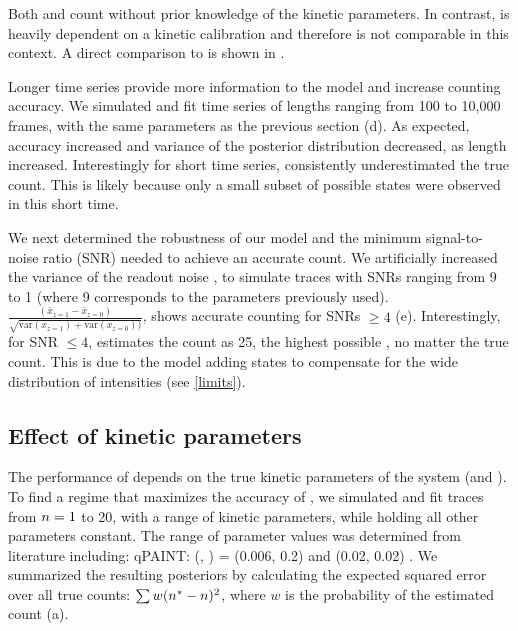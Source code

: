 Both \ours and \lbfcs count without prior knowledge of the kinetic parameters.
	In contrast, \qpaint is heavily dependent on a kinetic calibration and 
	therefore is not comparable in this context.
	A direct comparison to \qpaint is shown in .

Longer time series provide more
information to the model and increase counting accuracy.
	We simulated and fit time series of lengths ranging from 100 to 10,000 frames, with the same parameters 
	as the previous section (d).
	As expected, accuracy increased and variance of the posterior distribution decreased, 
	as length increased.
	Interestingly for short time series, \ours consistently underestimated the true count. 
	This is likely because only a small subset of possible states were observed in this short time. %

We next determined the robustness of our model and the minimum signal-to-noise ratio 
(SNR) needed to achieve an accurate count.
	We artificially increased the variance of the readout noise \camvar, 
	to simulate traces with SNRs ranging from 9 to 1 (where 9 
	corresponds to the parameters previously used).
  $ \frac{(\bar{x}_{z=1} - \bar{x}_{z=0})}{\sqrt{\text{var}(x_{z=1}) + \text{var}(x_{z=0}))}}$, 
	\ours shows accurate counting for SNRs $\geq 4$ (e). 
	Interestingly, for  SNR $\leq 4$, \ours estimates the count as 25, 
	the highest possible \n, no matter the true count. 
	This is due to the model adding states to compensate for the wide distribution of intensities  
	(see \ref{limits}).

\subsection{Effect of kinetic parameters}
The performance of \ours depends on the true kinetic parameters of the system (\pon and \poff).
%
	To find a regime that maximizes the accuracy of \ours, we simulated and fit traces 
	from $n=1$ to 20, with a range of kinetic parameters, 
	while holding all other parameters constant.
	The range of parameter values was determined from literature including:
	qPAINT: (\pon, \poff) = (0.006, 0.2) \cite{jungmann_2016} and \lbfcs (0.02, 0.02) \cite{stein_2021}. 
	We summarized the resulting posteriors by calculating the expected squared error over all true counts: 
	$\sum w(n^* - n)^2$, where $w$ is the probability of the estimated count \n 
	(a).


